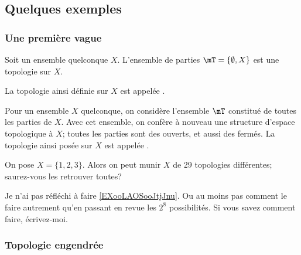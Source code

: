 \subsection{Quelques exemples}

\subsubsection{Une première vague}

\begin{example}\label{DefTopologieGrossiere}
	Soit un ensemble quelconque \( X\). L'ensemble de parties \( \mT=\{ \emptyset, X \}\) est une topologie sur \( X\).

	La topologie ainsi définie sur \(X \) est appelée .
\end{example}

\begin{example}\label{DefTopologieDiscrete}
	Pour un ensemble \( X \) quelconque, on considère l'ensemble \( \mT \) constitué de toutes les parties de \( X \). Avec cet ensemble, on confère à nouveau une structure d'espace topologique à \(X \); toutes les parties sont des ouverts, et aussi des fermés. La topologie ainsi posée sur \(X \) est appelée .
\end{example}

\begin{example}       \label{EXooLAOSooJtjJnu}
	On pose \( X = \{1, 2, 3\} \). Alors on peut munir \( X \) de 29 topologies différentes\cite{BIBooSLBZooRYtdIi}; saurez-vous les retrouver toutes?
\end{example}

\begin{probleme}
	Je n'ai pas réfléchi à faire \ref{EXooLAOSooJtjJnu}. Ou au moins pas comment le faire autrement qu'en passant en revue les \( 2^8\) possibilités. Si vous savez comment faire, écrivez-moi.
\end{probleme}

\subsubsection{Topologie engendrée}

